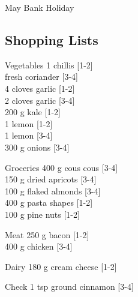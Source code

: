 \begin{menu}{May Bank Holiday}
    \subsection*{Shopping Lists}
      \begin{shoppinglist}{Vegetables}
      1  chillis 
        {\scriptsize[1-2]}\\
        fresh coriander 
        {\scriptsize[3-4]}\\
      4 cloves garlic 
        {\scriptsize[1-2]}\\
      2 cloves garlic 
        {\scriptsize[3-4]}\\
      200 g kale 
        {\scriptsize[1-2]}\\
      1  lemon 
        {\scriptsize[1-2]}\\
      1  lemon 
        {\scriptsize[3-4]}\\
      300 g onions 
        {\scriptsize[3-4]}\\
      \end{shoppinglist}%
      \begin{shoppinglist}{Groceries}
      400 g cous cous 
        {\scriptsize[3-4]}\\
      150 g dried apricots 
        {\scriptsize[3-4]}\\
      100 g flaked almonds 
        {\scriptsize[3-4]}\\
      400 g pasta shapes 
        {\scriptsize[1-2]}\\
      100 g pine nuts 
        {\scriptsize[1-2]}\\
      \end{shoppinglist}%
      \par\vfil %
      \begin{shoppinglist}{Meat}
      250 g bacon 
        {\scriptsize[1-2]}\\
      400 g chicken 
        {\scriptsize[3-4]}\\
      \end{shoppinglist}%
      \begin{shoppinglist}{Dairy}
      180 g cream cheese 
        {\scriptsize[1-2]}\\
      \end{shoppinglist}%
      \par\vfil %
      \vfil\clearpage %
      \begin{shoppinglist}{Check}
      1 tsp ground cinnamon 
        {\scriptsize[3-4]}\\

\end{shoppinglist}
\end{menu}
